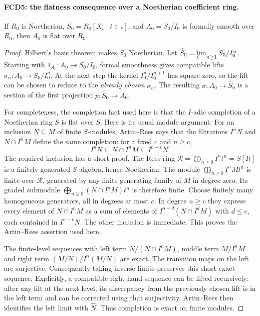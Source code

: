 \paragraph{FCD5: the flatness consequence over a Noetherian coefficient ring.}
\label{claim:FCD5}
If $R_0$ is Noetherian, $S_0=R_0[X_i\mid i\in\iota]$, and
$A_0=S_0/I_0$ is formally smooth over $R_0$, then $A_0$ is
flat over $R_0$.

\begin{proof}
Hilbert's basis theorem makes $S_0$ Noetherian.  Let
$\widehat S_0=\varprojlim_{n\ge1}S_0/I_0^n$.
Starting with $1_{A_0}:A_0\to S_0/I_0$, formal smoothness gives
compatible lifts $\sigma_n:A_0\to S_0/I_0^n$.
At the next step the kernel $I_0^n/I_0^{n+1}$ has square zero,
so the lift can be chosen to reduce to the \emph{already chosen}
$\sigma_n$.  The resulting $\sigma:A_0\to\widehat S_0$
is a section of the first projection $p:\widehat S_0\to A_0$.

For completeness, the completion fact used here is that the
$I$-adic completion of a Noetherian ring $S$ is flat over $S$.
Here is its usual module argument.  For an inclusion $N\subseteq M$
of finite $S$-modules, Artin--Rees says that the filtrations
$I^nN$ and $N\cap I^nM$ define the same completion: for a fixed
$c$ and $n\ge c$,
\[
 I^nN\subseteq N\cap I^nM\subseteq I^{n-c}N.
\]
The required inclusion has a short proof.  The Rees ring
$\mathcal R=\bigoplus_{n\ge0}I^nt^n=S[It]$ is a finitely
generated $S$-algebra, hence Noetherian.  The module
$\bigoplus_{n\ge0}I^nMt^n$ is finite over $\mathcal R$,
generated by any finite generating family of $M$ in degree zero.
Its graded submodule
$\bigoplus_{n\ge0}(N\cap I^nM)t^n$ is therefore finite.
Choose finitely many homogeneous generators, all in degrees at
most $c$.  In degree $n\ge c$ they express every element of
$N\cap I^nM$ as a sum of elements of
$I^{n-d}(N\cap I^dM)$ with $d\le c$, each contained in
$I^{n-c}N$.  The other inclusion is immediate.  This proves
the Artin--Rees assertion used here.

The finite-level sequences with left term
$N/(N\cap I^nM)$, middle term $M/I^nM$ and right term
$(M/N)/I^n(M/N)$ are exact.  The transition maps on the left
are surjective.  Consequently taking inverse limits preserves this
short exact sequence.  Explicitly, a compatible right-hand sequence
can be lifted recursively: after any lift at the next level, its
discrepancy from the previously chosen lift is in the left term and
can be corrected using that surjectivity.  Artin--Rees then identifies
the left limit with $\widehat N$.  Thus completion is exact on
finite modules.


\end{proof}
